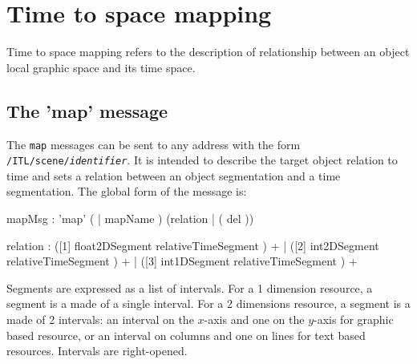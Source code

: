 \documentclass[a4paper,twoside]{report}
\newcommand{\toplevel}[1]	{\chapter{#1}}
\newcommand{\sublevel}[1]	{\section{#1}}
\newcommand{\OSC}[1]		{\texttt{#1}}
\begin{document}

\toplevel{Time to space mapping}
\label{mapping}

Time to space mapping refers to the description of relationship between an object local graphic space and its time space. 

\sublevel{The 'map' message}
\label{mapMsg}

The \OSC{map} messages can be sent to any address with the form \OSC{/ITL/scene/\textit{identifier}}. It is intended to describe the target object relation to time and sets a relation between an object segmentation and a time segmentation. 
The global form of the message is:

\begin{rail}
mapMsg : 'map' ( | mapName ) (relation	|	( del ))
\end{rail}

\begin{rail}
relation : 
		([1] float2DSegment relativeTimeSegment ) +
	| 	([2] int2DSegment relativeTimeSegment ) +
	| 	([3] int1DSegment relativeTimeSegment ) + 
\end{rail}

Segments are expressed as a list of intervals. For a 1 dimension resource, a segment is a made of a single interval. For a 2 dimensions resource, a segment is a made of 2 intervals: an interval on the $x$-axis and one on the $y$-axis for graphic based resource, or an interval on columns and one on lines for text based resources. Intervals are right-opened.
\end{document}
